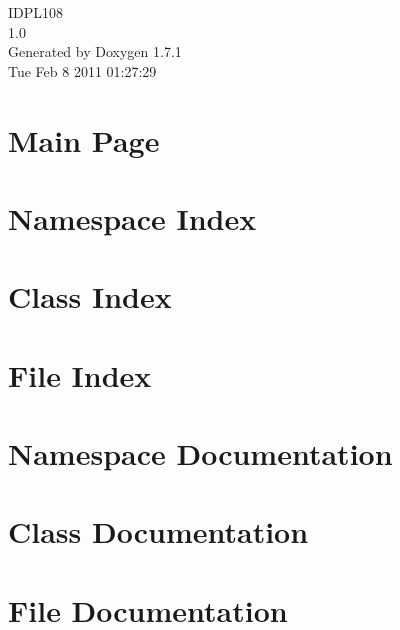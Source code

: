 \documentclass[a4paper]{book}
\begin{document}
\hypersetup{pageanchor=false}
\begin{titlepage}
\vspace*{7cm}
\begin{center}
{\Large IDPL108 \\[1ex]\large 1.0 }\\
\vspace*{1cm}
{\large Generated by Doxygen 1.7.1}\\
\vspace*{0.5cm}
{\small Tue Feb 8 2011 01:27:29}\\
\end{center}
\end{titlepage}
\clearemptydoublepage
{}
\tableofcontents
\clearemptydoublepage
{}
\hypersetup{pageanchor=true}
\chapter{Main Page}
\label{index}\hypertarget{index}{}
\chapter{Namespace Index}

\chapter{Class Index}

\chapter{File Index}

\chapter{Namespace Documentation}

\chapter{Class Documentation}








\chapter{File Documentation}
















\printindex
\end{document}

